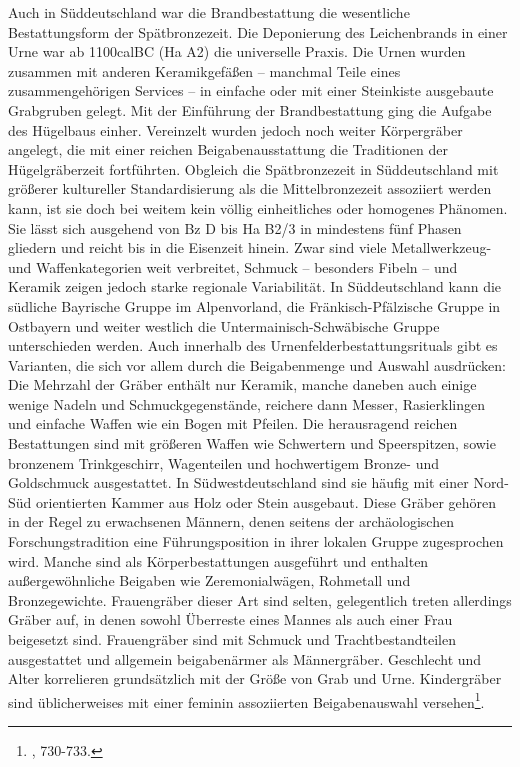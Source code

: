 \documentclass[openany,twoside,twocolumn]{book}
\let\rmarkdownfootnote\footnote%
\def\footnote{\protect\rmarkdownfootnote}
\begin{document}
Auch in Süddeutschland war die Brandbestattung die wesentliche
Bestattungsform der Spätbronzezeit. Die Deponierung des Leichenbrands in
einer Urne war ab 1100calBC (Ha A2) die universelle Praxis. Die Urnen
wurden zusammen mit anderen Keramikgefäßen -- manchmal Teile eines
zusammengehörigen Services -- in einfache oder mit einer Steinkiste
ausgebaute Grabgruben gelegt. Mit der Einführung der Brandbestattung
ging die Aufgabe des Hügelbaus einher. Vereinzelt wurden jedoch noch
weiter Körpergräber angelegt, die mit einer reichen Beigabenausstattung
die Traditionen der Hügelgräberzeit fortführten. Obgleich die
Spätbronzezeit in Süddeutschland mit größerer kultureller
Standardisierung als die Mittelbronzezeit assoziiert werden kann, ist
sie doch bei weitem kein völlig einheitliches oder homogenes Phänomen.
Sie lässt sich ausgehend von Bz D bis Ha B2/3 in mindestens fünf Phasen
gliedern und reicht bis in die Eisenzeit hinein. Zwar sind viele
Metallwerkzeug- und Waffenkategorien weit verbreitet, Schmuck --
besonders Fibeln -- und Keramik zeigen jedoch starke regionale
Variabilität. In Süddeutschland kann die südliche Bayrische Gruppe im
Alpenvorland, die Fränkisch-Pfälzische Gruppe in Ostbayern und weiter
westlich die Untermainisch-Schwäbische Gruppe unterschieden werden. Auch
innerhalb des Urnenfelderbestattungsrituals gibt es Varianten, die sich
vor allem durch die Beigabenmenge und Auswahl ausdrücken: Die Mehrzahl
der Gräber enthält nur Keramik, manche daneben auch einige wenige Nadeln
und Schmuckgegenstände, reichere dann Messer, Rasierklingen und einfache
Waffen wie ein Bogen mit Pfeilen. Die herausragend reichen Bestattungen
sind mit größeren Waffen wie Schwertern und Speerspitzen, sowie
bronzenem Trinkgeschirr, Wagenteilen und hochwertigem Bronze- und
Goldschmuck ausgestattet. In Südwestdeutschland sind sie häufig mit
einer Nord-Süd orientierten Kammer aus Holz oder Stein ausgebaut. Diese
Gräber gehören in der Regel zu erwachsenen Männern, denen seitens der
archäologischen Forschungstradition eine Führungsposition in ihrer
lokalen Gruppe zugesprochen wird. Manche sind als Körperbestattungen
ausgeführt und enthalten außergewöhnliche Beigaben wie Zeremonialwägen,
Rohmetall und Bronzegewichte. Frauengräber dieser Art sind selten,
gelegentlich treten allerdings Gräber auf, in denen sowohl Überreste
eines Mannes als auch einer Frau beigesetzt sind. Frauengräber sind mit
Schmuck und Trachtbestandteilen ausgestattet und allgemein beigabenärmer
als Männergräber. Geschlecht und Alter korrelieren grundsätzlich mit der
Größe von Grab und Urne. Kindergräber sind üblicherweises mit einer
feminin assoziierten Beigabenauswahl versehen\footnote{\textcite{jockenhovel_germany_2013},
  730-733.}.
\end{document}
